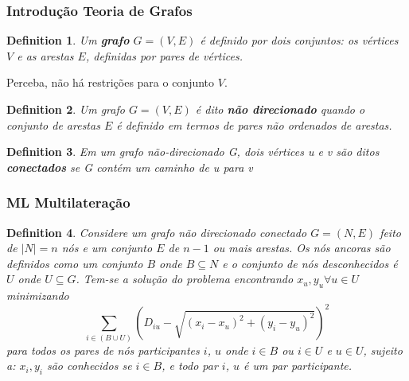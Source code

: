 \documentclass{beamer}
\newtheorem{definicao}{Definition}
\begin{document}
\begin{frame}
\frametitle{\normalsize Introdução Teoria de Grafos}
\begin{flushleft}
	\begin{definicao}
		Um \textbf{grafo} $G = (V,E)$ é definido por dois conjuntos: os vértices $V$ e as arestas $E$, definidas por pares de vértices.
	\end{definicao}
	Perceba, não há restrições para o conjunto $V$.
	\vspace{0.5cm}
	\begin{definicao}
		Um grafo $G = (V,E)$ é dito \textbf{não direcionado} quando o conjunto de arestas $E$ é definido em termos de pares não ordenados de arestas.
	\end{definicao}

	\begin{definicao}
		Em um grafo não-direcionado G, dois vértices u e v são ditos \textbf{conectados} se G contém um caminho de u para v
	\end{definicao}
	
\end{flushleft}
\end{frame}

\begin{frame}
\frametitle{\normalsize ML Multilateração}
\begin{flushleft}
	\begin{definicao}
		\hspace{0.5cm}Considere um grafo não direcionado conectado $G = (N, E)$ feito de $|N| = n$ nós e um conjunto $E$ de $n - 1$ ou mais arestas. Os nós ancoras são definidos como um conjunto $B$ onde $B \subseteq N$ e o conjunto de nós desconhecidos é $U$ onde $U \subseteq G$. Tem-se a solução do problema encontrando $x_{u}, y_{u} \forall u \in U$ minimizando 
		$$ \sum_{i \in (B \cup U)} (D_{iu} - \sqrt{(x_i - x_u)^2 + (y_i - y_u)^2})^2 $$
		para todos os pares de nós participantes $i$, $u$ onde $i \in B$ ou $i \in U$ e $u \in U$, sujeito a: $x_{i}, y_i$ são conhecidos se $i \in B$, e todo par $i$, $u$ é um par participante.
	\end{definicao}
	
\end{flushleft}
\end{frame}
\end{document}

